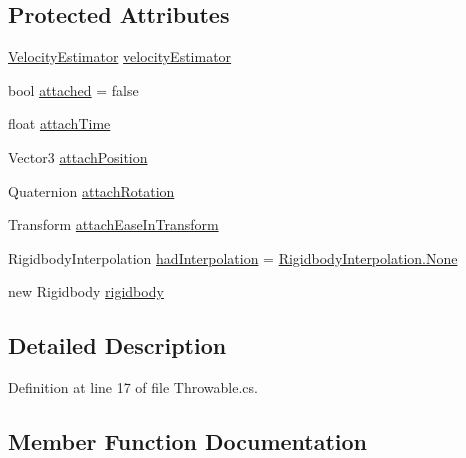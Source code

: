\subsection*{Protected Attributes}
\begin{DoxyCompactItemize}
\item 
\mbox{\hyperlink{class_valve_1_1_v_r_1_1_interaction_system_1_1_velocity_estimator}{Velocity\+Estimator}} \mbox{\hyperlink{class_valve_1_1_v_r_1_1_interaction_system_1_1_throwable_a19421d37faa186b5c0271a73e2976484}{velocity\+Estimator}}
\item 
bool \mbox{\hyperlink{class_valve_1_1_v_r_1_1_interaction_system_1_1_throwable_ac0133980c2673c707c3eddf40d973670}{attached}} = false
\item 
float \mbox{\hyperlink{class_valve_1_1_v_r_1_1_interaction_system_1_1_throwable_afa7afa89b85a2decca730e217ad7d807}{attach\+Time}}
\item 
Vector3 \mbox{\hyperlink{class_valve_1_1_v_r_1_1_interaction_system_1_1_throwable_a41ab4ee9a6ae0fe64045fb9453366b24}{attach\+Position}}
\item 
Quaternion \mbox{\hyperlink{class_valve_1_1_v_r_1_1_interaction_system_1_1_throwable_a9b65d4f08e91341132e5dfcd011fc7d8}{attach\+Rotation}}
\item 
Transform \mbox{\hyperlink{class_valve_1_1_v_r_1_1_interaction_system_1_1_throwable_ae2e434b1a5a71076ff41e3b8d593fbe3}{attach\+Ease\+In\+Transform}}
\item 
Rigidbody\+Interpolation \mbox{\hyperlink{class_valve_1_1_v_r_1_1_interaction_system_1_1_throwable_a22c7869dc935bef435a290824507fa64}{had\+Interpolation}} = \mbox{\hyperlink{namespace_valve_1_1_v_r_1_1_interaction_system_ae03ab84d315f5997fd000817bfb96a0fa6adf97f83acf6453d4a6a4b1070f3754}{Rigidbody\+Interpolation.\+None}}
\item 
new Rigidbody \mbox{\hyperlink{class_valve_1_1_v_r_1_1_interaction_system_1_1_throwable_adc5a38d1b150a29c9deb08fdfd52b497}{rigidbody}}
\end{DoxyCompactItemize}


\subsection{Detailed Description}


Definition at line 17 of file Throwable.\+cs.



\subsection{Member Function Documentation}
\mbox{\label{class_valve_1_1_v_r_1_1_interaction_system_1_1_throwable_a24abdee13fd616927dbf00d13b9ecd53}} 

